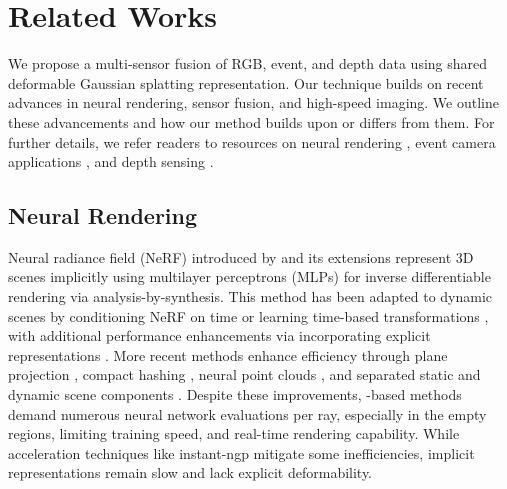 \section{Related Works}
\label{related_works}


We propose a multi-sensor fusion of RGB, event, and depth data using shared deformable Gaussian splatting representation. Our technique builds on recent advances in neural rendering, sensor fusion, and high-speed imaging. 
We outline these advancements and how our method builds upon or differs from them. 
For further details, we refer readers to resources on neural rendering \cite{xie2022neural, tewari2022advances, fei20243d}, event camera applications \cite{gallego2020event}, and depth sensing \cite{horaud2016overview, szeliski2022computer}.


\subsection{Neural Rendering}

Neural radiance field (NeRF) introduced by \citet{mildenhall2021nerf} and its extensions \cite{barron2021mip,zhang2020nerf++} represent 3D scenes implicitly using multilayer perceptrons (MLPs) for inverse differentiable rendering via analysis-by-synthesis.
This method has been adapted to dynamic scenes \cite{pumarola2020d, liu2022devrf} by conditioning NeRF on time \cite{li2021neural, du2021neural, xian2021space} or learning time-based transformations \cite{pumarola2021d,park2021nerfies,tretschk2021non,lombardi2019neural,gao2021dynamic},
with additional performance enhancements via incorporating explicit representations \cite{muller2022instant, mobilenerf, plenoxels, kulhanek2023tetra}.
More recent methods enhance efficiency through plane projection \cite{cao2023hexplane,fridovich2023k,shao2023tensor4d}, compact hashing \cite{wang2024masked}, neural point clouds \cite{kappel2024d}, and separated static and dynamic scene components \cite{song2023nerfplayer}.
Despite these improvements, \nerf-based methods demand numerous neural network evaluations per ray, especially in the empty regions, limiting training speed, and real-time rendering capability. While acceleration techniques like instant-ngp \cite{muller2022instant, chen2025neural} mitigate some inefficiencies,  
implicit representations remain slow and lack explicit deformability.

